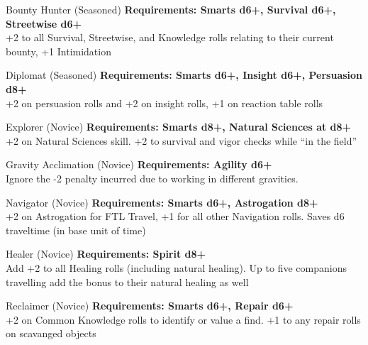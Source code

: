 \begin{multicols}{2}
\begin{genericsection}{Bounty Hunter (Seasoned)}
\textbf{Requirements: Smarts d6+, Survival d6+, Streetwise d6+}\\
+2 to all Survival, Streetwise, and Knowledge rolls relating to their current bounty, +1 Intimidation
\end{genericsection}

\begin{genericsection}{Diplomat (Seasoned)}
\textbf{Requirements: Smarts d6+, Insight d6+, Persuasion d8+}\\
+2 on persuasion rolls and +2 on insight rolls, +1 on reaction table rolls
\end{genericsection}

\begin{genericsection}{Explorer (Novice)}
\textbf{Requirements: Smarts d8+, Natural Sciences at d8+}\\
+2 on Natural Sciences skill. +2 to survival and vigor checks while “in the field”
\end{genericsection}

\begin{genericsection}{Gravity Acclimation (Novice)}
\textbf{Requirements: Agility d6+}\\
Ignore the -2 penalty incurred due to working in different gravities.
\end{genericsection}

\begin{genericsection}{Navigator (Novice)}
\textbf{Requirements: Smarts d6+, Astrogation d8+}\\
+2 on Astrogation for FTL Travel, +1 for all other Navigation rolls. Saves d6 traveltime (in base unit of time)
\end{genericsection}

\begin{genericsection}{Healer (Novice)}
\textbf{Requirements: Spirit d8+}\\
Add +2 to all Healing rolls (including natural healing). Up to five companions travelling add the bonus to their natural healing as well
\end{genericsection}

\begin{genericsection}{Reclaimer (Novice)}
\textbf{Requirements: Smarts d6+, Repair d6+}\\
+2 on Common Knowledge rolls to identify or value a find. +1 to any repair rolls on scavanged objects
\end{genericsection}


\end{multicols}
